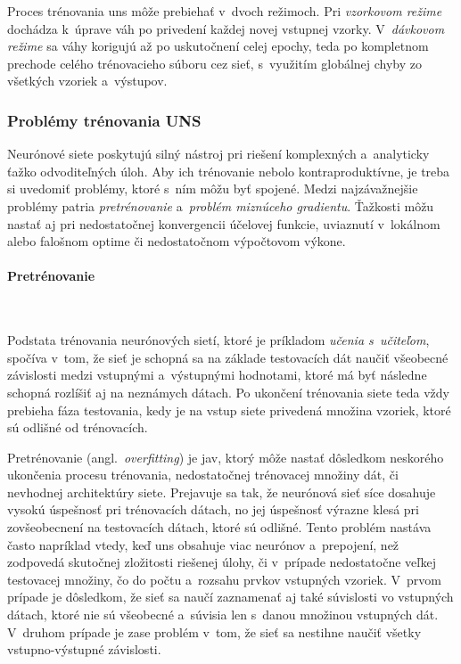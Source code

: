     Proces trénovania \acrshort{uns} môže prebiehať v~dvoch režimoch. Pri \emph{vzorkovom režime} dochádza k~úprave váh po privedení každej novej vstupnej vzorky. V~\emph{dávkovom režime} sa váhy korigujú až po uskutočnení celej epochy, teda po kompletnom prechode celého trénovacieho súboru cez sieť, s~využitím globálnej chyby zo všetkých vzoriek a~výstupov.
        
    \subsubsection{Problémy trénovania UNS}\label{ssec:training-problems}

      Neurónové siete poskytujú silný nástroj pri riešení komplexných a~analyticky ťažko odvoditeľných úloh. Aby ich trénovanie nebolo kontraproduktívne, je treba si uvedomiť problémy, ktoré s~ním môžu byť spojené. Medzi najzávažnejšie problémy patria \emph{pretrénovanie} a~\emph{problém miznúceho gradientu}. Ťažkosti môžu nastať aj pri nedostatočnej konvergencii účelovej funkcie, uviaznutí v~lokálnom alebo falošnom optime či nedostatočnom výpočtovom výkone.

      \paragraph{Pretrénovanie} \

      \noindent Podstata trénovania neurónových sietí, ktoré je príkladom \emph{učenia s~učiteľom}, spočíva v~tom, že sieť je schopná sa na základe testovacích dát naučiť všeobecné závislosti medzi vstupnými a~výstupnými hodnotami, ktoré má byť následne schopná rozlíšiť aj na neznámych dátach. Po ukončení trénovania siete teda vždy prebieha fáza testovania, kedy je na vstup siete privedená množina vzoriek, ktoré sú odlišné od trénovacích.

      Pretrénovanie (angl.\ \emph{overfitting}) je jav, ktorý môže nastať dôsledkom neskorého ukončenia procesu trénovania, nedostatočnej trénovacej množiny dát, či nevhodnej architektúry siete. Prejavuje sa tak, že neurónová sieť síce dosahuje vysokú úspešnosť pri trénovacích dátach, no jej úspešnosť výrazne klesá pri zovšeobecnení na testovacích dátach, ktoré sú odlišné. Tento problém nastáva často napríklad vtedy, keď \acrshort{uns} obsahuje viac neurónov a~prepojení, než zodpovedá skutočnej zložitosti riešenej úlohy, či v~prípade nedostatočne veľkej testovacej množiny, čo do počtu a~rozsahu prvkov vstupných vzoriek. V~prvom prípade je dôsledkom, že sieť sa naučí zaznamenať aj také súvislosti vo vstupných dátach, ktoré nie sú všeobecné a~súvisia len s~danou množinou vstupných dát. V~druhom prípade je zase problém v~tom, že sieť sa nestihne naučiť všetky vstupno-výstupné závislosti.

